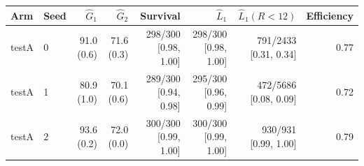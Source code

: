 \begin{tabular}{llrrrrrr}
\toprule
Arm & Seed & $\hat G_1$ & $\hat G_2$ & Survival & $\hat L_1$ & $\hat L_1(R<12)$ & Efficiency \\
\midrule
testA & 0 & 91.0 (0.6) & 71.6 (0.3) & 298/300 [0.98, 1.00] & 298/300 [0.98, 1.00] & 791/2433 [0.31, 0.34] & 0.77 \\
testA & 1 & 80.9 (1.0) & 70.1 (0.6) & 289/300 [0.94, 0.98] & 295/300 [0.96, 0.99] & 472/5686 [0.08, 0.09] & 0.72 \\
testA & 2 & 93.6 (0.2) & 72.0 (0.0) & 300/300 [0.99, 1.00] & 300/300 [0.99, 1.00] & 930/931 [0.99, 1.00] & 0.79 \\
\bottomrule
\end{tabular}
